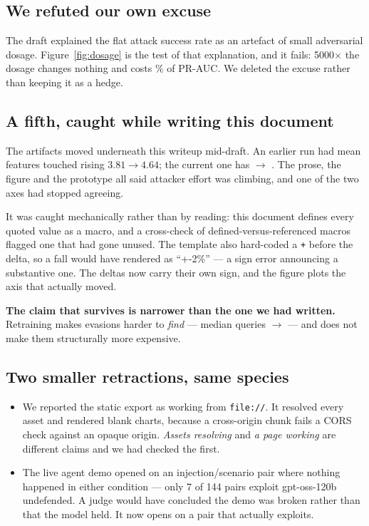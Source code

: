 \documentclass[11pt,a4paper]{article}
\newcommand{\claim}[1]{\textcolor{attack}{\textbf{#1}}}
\begin{document}
\subsection{We refuted our own excuse}

The draft explained the flat attack success rate as an artefact of small adversarial dosage.
Figure~\ref{fig:dosage} is the test of that explanation, and it fails: 5000$\times$ the
dosage changes nothing and costs \DosagePrAucDrop\% of PR-AUC. We deleted the excuse rather
than keeping it as a hedge.

\subsection{A fifth, caught while writing this document}

The artifacts moved underneath this writeup mid-draft. An earlier run had mean features
touched rising \(3.81 \to 4.64\); the current one has \LzeroFirst{} \(\to\) \LzeroLast{}.
The prose, the figure and the prototype all said attacker effort was climbing, and one of
the two axes had stopped agreeing.

It was caught mechanically rather than by reading: this document defines every quoted value
as a macro, and a cross-check of defined-versus-referenced macros flagged one that had gone
unused. The template also hard-coded a \texttt{+} before the delta, so a fall would have
rendered as ``+-2\%'' --- a sign error announcing a substantive one. The deltas now carry
their own sign, and the figure plots the axis that actually moved.

\claim{The claim that survives is narrower than the one we had written.} Retraining makes
evasions harder to \emph{find} --- median queries \QueriesFirst{} \(\to\) \QueriesLast{} --- and
does not make them structurally more expensive.

\subsection{Two smaller retractions, same species}

\begin{itemize}
  \item We reported the static export as working from \texttt{file://}. It resolved every
        asset and rendered blank charts, because a cross-origin chunk fails a CORS check
        against an opaque origin. \emph{Assets resolving} and \emph{a page working} are
        different claims and we had checked the first.
  \item The live agent demo opened on an injection/scenario pair where nothing happened in
        either condition --- only 7 of 144 pairs exploit gpt-oss-120b undefended. A judge
        would have concluded the demo was broken rather than that the model held. It now
        opens on a pair that actually exploits.
\end{itemize}
\end{document}
